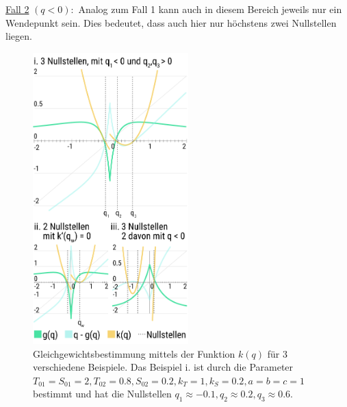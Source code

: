 \documentclass[a4paper,twoside]{article}
\begin{document}
	\noindent\underline{Fall 2} \((q < 0):\) Analog zum Fall 1 kann auch in diesem Bereich jeweils nur ein Wendepunkt sein. Dies bedeutet, dass auch hier nur höchstens zwei Nullstellen liegen.
	
	\begin{figure}[!h]
  		\centering
 		\includegraphics[width=6cm]{../Diagramme/q_von_q_falluntersuchung_anderes_layout.png}
  		\caption{Gleichgewichtsbestimmung mittels der Funktion \(k(q)\) für 3 verschiedene Beispiele. Das Beispiel i. ist durch die Parameter \(T_{01} = S_{01} = 2, T_{02} = 0.8, S_{02} = 0.2, k_T = 1, k_S = 0.2, a = b = c = 1 \) bestimmt und hat die Nullstellen \(q_1 \approx -0.1, q_2 \approx 0.2, q_3 \approx 0.6\). }
  		\label{fig:q_von_q_falluntersuchung}
	\end{figure}	
	
\end{document}
